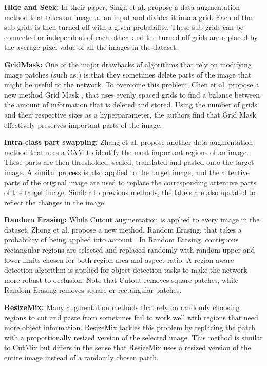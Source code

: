 \textbf{Hide and Seek: }
In their paper, Singh et al. \cite{singhHideandSeekDataAugmentation2018} propose a data augmentation method that takes an image as an input and divides it into a grid. Each of the sub-grids is then turned off with a given probability. These sub-grids can be connected or independent of each other, and the turned-off grids are replaced by the average pixel value of all the images in the dataset.

\textbf{GridMask: }
One of the major drawbacks of algorithms that rely on modifying image patches (such as \cite{singhHideandSeekDataAugmentation2018,devriesImprovedRegularizationConvolutional2017,zhongRandomErasingData2020}) is that they sometimes delete parts of the image that might be useful to the network. To overcome this problem, Chen et al. propose a new method Grid Mask \cite{chenGridMaskDataAugmentation2020}, that uses evenly spaced grids to find a balance between the amount of information that is deleted and stored. Using the number of grids and their respective sizes as a hyperparameter, the authors find that Grid Mask effectively preserves important parts of the image.

\textbf{Intra-class part swapping: }
Zhang et al. propose another data augmentation method that uses a CAM \cite{zhouLearningDeepFeatures2016} to identify the most important regions of an image. These parts are then thresholded, scaled, translated and pasted onto the target image. A similar process is also applied to the target image, and the attentive parts of the original image are used to replace the corresponding attentive parts of the target image. Similar to previous methods, the labels are also updated to reflect the changes in the image.

\textbf{Random Erasing: }
While Cutout augmentation \cite{devriesImprovedRegularizationConvolutional2017} is applied to every image in the dataset, Zhong et al. propose a new method, Random Erasing, that takes a probability of being applied into account \cite{zhongRandomErasingData2020}. In Random Erasing, contiguous rectangular regions are selected and replaced randomly with random upper and lower limits chosen for both region area and aspect ratio. A region-aware detection algorithm is applied for object detection tasks to make the network more robust to occlusion. Note that Cutout removes square patches, while Random Erasing removes square or rectangular patches.

\textbf{ResizeMix: }
Many augmentation methods that rely on randomly choosing regions to cut and paste from sometimes fail to work well with regions that need more object information. ResizeMix \cite{qinResizeMixMixingData2020} tackles this problem by replacing the patch with a proportionally resized version of the selected image. This method is similar to CutMix \cite{yunCutMixRegularizationStrategy2019} but differs in the sense that ResizeMix uses a resized version of the entire image instead of a randomly chosen patch.

